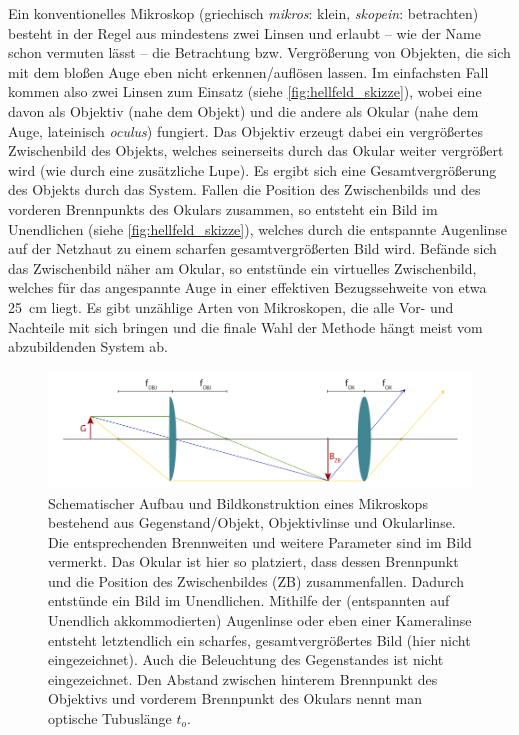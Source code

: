 \documentclass[english, ngerman]{scrartcl}
\begin{document}
Ein konventionelles Mikroskop (griechisch \textit{mikros}: klein, \textit{skopein}: betrachten) besteht in der Regel aus mindestens zwei Linsen und erlaubt -- wie der Name schon vermuten lässt -- die Betrachtung bzw. Vergrößerung von Objekten, die sich mit dem bloßen Auge eben nicht erkennen/auflösen lassen. Im einfachsten Fall kommen also zwei Linsen zum Einsatz (siehe \autoref{fig:hellfeld_skizze}), wobei eine davon als Objektiv (nahe dem Objekt) und die andere als Okular (nahe dem Auge, lateinisch \textit{oculus}) fungiert. Das Objektiv erzeugt dabei ein vergrößertes Zwischenbild des Objekts, welches seinerseits durch das Okular weiter vergrößert wird (wie durch eine zusätzliche Lupe). Es ergibt sich eine Gesamtvergrößerung des Objekts durch das System. Fallen die Position des Zwischenbilds und des vorderen Brennpunkts des Okulars zusammen, so entsteht ein Bild im Unendlichen (siehe \autoref{fig:hellfeld_skizze}), welches durch die entspannte Augenlinse auf der Netzhaut zu einem scharfen gesamtvergrößerten Bild wird. Befände sich das Zwischenbild näher am Okular, so entstünde ein virtuelles Zwischenbild, welches für das angespannte Auge in einer effektiven Bezugssehweite von etwa \SI{25}{cm} liegt. Es gibt unzählige Arten von Mikroskopen, die alle Vor- und Nachteile mit sich bringen und die finale Wahl der Methode hängt meist vom abzubildenden System ab.
%
\begin{figure}[H]
    \centering
    \begin{samepage}
        \includegraphics[width=\linewidth]{fig/Hellfeld.png}
        \caption[Aufbau eines Hellfeld-Transmissionsmikroskops]{Schematischer Aufbau und Bildkonstruktion eines Mikroskops bestehend aus Gegenstand/Objekt, Objektivlinse und Okularlinse. Die entsprechenden Brennweiten und weitere Parameter sind im Bild vermerkt. Das Okular ist hier so platziert, dass dessen Brennpunkt und die Position des Zwischenbildes (ZB) zusammenfallen. Dadurch entstünde ein Bild im Unendlichen. Mithilfe der (entspannten auf Unendlich akkommodierten) Augenlinse oder eben einer Kameralinse entsteht letztendlich ein scharfes, gesamtvergrößertes Bild (hier nicht eingezeichnet). Auch die Beleuchtung des Gegenstandes ist nicht eingezeichnet. Den Abstand zwischen hinterem Brennpunkt des Objektivs und vorderem Brennpunkt des Okulars nennt man optische Tubuslänge $t_o$.}
        \label{fig:hellfeld_skizze}
    \end{samepage}
\end{figure}
%
\end{document}
